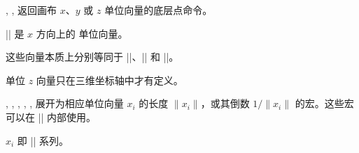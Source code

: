 %
%

\begin{commandlist}{%
    \pgfplotspointunitx,
    \pgfplotspointunity,
    \pgfplotspointunitz%
}
    返回画布 $x$、$y$ 或 $z$ 单位向量的底层点命令。

    |\pgfplotspointunitx| 是 $x$ 方向上的 \pgfname{} 单位向量。

    这些向量本质上分别等同于\linebreak
    ||、||\linebreak
    和 ||。

    单位 $z$ 向量只在三维坐标轴中才有定义。
\end{commandlist}

\begin{commandlist}{%
    \pgfplotsunitxlength,
    \pgfplotsunitylength,
    \pgfplotsunitzlength,
    \pgfplotsunitxinvlength,
    \pgfplotsunityinvlength,
    \pgfplotsunitzinvlength%
}
    展开为相应单位向量 $x_i$ 的长度 $\lVert x_i \rVert$，或其倒数 $1/\lVert x_i \rVert$ 的宏。这些宏可以在 |\pgfmathparse| 内部使用。

    $x_i$ 即 |\pgfplotspointunitx| 系列。
\end{commandlist}

